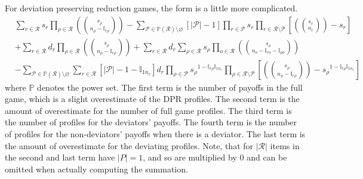 \documentclass{article}
\newcommand{\reps}[2]{\left(\!\!{#1\choose #2}\!\!\right)}
\begin{document}
For deviation preserving reduction games, the form is a little more complicated.
\begin{equation*}
    \begin{split}
        & \sum_{r \in \mathcal R} s_r \prod_{\rho \in \mathcal R} \reps{s_\rho}{n_\rho - \mathbb{I}_{r\rho}}
         - \sum_{\mathcal P \in \mathbb P(\mathcal R) \setminus \varnothing} \left[ |\mathcal P| - 1 \right] \prod_{r \in \mathcal P} s_r \prod_{r \in \mathcal R \setminus \mathcal P} \left[ \reps{s_r}{n_r} - s_r \right] \\
        & + \sum_{r \in \mathcal R} d_r \prod_{\rho \in \mathcal R} \reps{s_\rho}{n_\rho - \mathbb{I}_{r\rho}}
        + \sum_{r \in \mathcal R} d_r \sum_{\rho \in \mathcal R} s_\rho \prod_{o \in \mathcal R} \reps{s_o}{n_o - \mathbb{I}_{ro} - \mathbb{I}_{\rho{}o}} \\
        & - \sum_{\mathcal P \in \mathbb P(\mathcal R) \setminus \varnothing} \sum_{r \in \mathcal R} \left[ |\mathcal P| - 1 - \mathbb{I}_{1n_r} \right] d_r \prod_{\rho \in \mathcal P} {s_\rho}^{1 - \mathbb{I}_{r\rho} \mathbb{I}_{1n_r}} \prod_{\rho \in \mathcal R \setminus \mathcal P} \left[ \reps{s_\rho}{n_\rho - \mathbb{I}_{r\rho}} - {s_\rho}^{1 - \mathbb{I}_{r\rho} \mathbb{I}_{1n_r}} \right]
    \end{split}
\end{equation*}
where $\mathbb P$ denotes the power set.
The first term is the number of payoffs in the full game, which is a slight overestimate of the DPR profiles.
The second term is the amount of overestimate for the number of full game profiles.
The third term is the number of profiles for the deviators' payoffs.
The fourth term is the number of profiles for the non-deviators' payoffs when there is a deviator.
The last term is the amount of overestimate for the deviating profiles.
Note, that for $|\mathcal R|$ items in the second and last term have $|P| = 1$, and so are multiplied by 0 and can be omitted when actually computing the summation.
\end{document}
